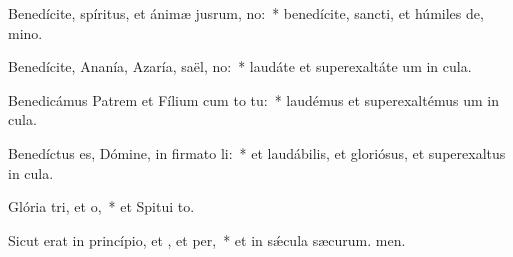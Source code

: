 \item Benedícite, spíritus, et ánimæ jusrum, no:~* benedícite, sancti, et húmiles de, mino.
\item Benedícite, Ananía, Azaría, saël, no:~* laudáte et superexaltáte um in cula.
\item Benedicámus Patrem et Fílium cum to tu:~* laudémus et superexaltémus um in cula.
\item Benedíctus es, Dómine, in firmato li:~* et laudábilis, et gloriósus, et superexaltus in cula.
\item Glória tri, et o,~* et Spitui to.
\item Sicut erat in princípio, et , et per,~* et in sǽcula sæcurum. men.

